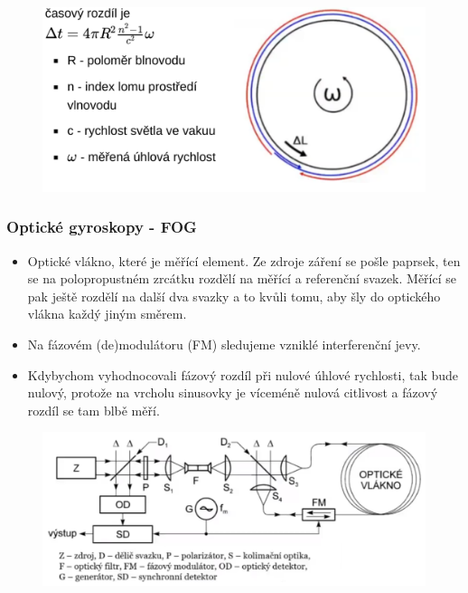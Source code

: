 \begin{figure}[h]
    \includegraphics[scale = 0.40]{img/sagnac.png}
\end{figure}

\subsubsection*{Optické gyroskopy - FOG}
\begin{itemize}
    \item Optické vlákno, které je měřící element. Ze zdroje záření se pošle paprsek, ten se na polopropustném zrcátku rozdělí na měřící a referenční svazek. Měřící se pak ještě rozdělí na další dva svazky a to kvůli tomu, aby šly do optického vlákna každý jiným směrem.
    \item Na fázovém (de)modulátoru (FM) sledujeme vzniklé interferenční jevy.
    \item Kdybychom vyhodnocovali fázový rozdíl při nulové úhlové rychlosti, tak bude nulový, protože na vrcholu sinusovky je víceméně nulová citlivost a fázový rozdíl se tam blbě měří.
\end{itemize}

\begin{figure}[h]
    \centering
    \includegraphics[scale = 0.40]{img/fog.png}
\end{figure}


